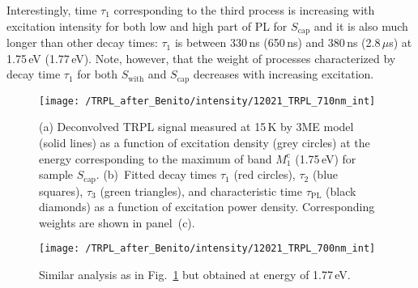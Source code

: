 


Interestingly, time $\tau_1$ corresponding to the third process is increasing with excitation intensity for both low and high part of PL for $S_\mathrm{cap}$ and it is also much longer than other decay times: $\tau_1$ is between 330$\,$ns (650$\,$ns) and 380$\,$ns (2.8$\,$$\mu$s) at 1.75$\,$eV (1.77$\,$eV). Note, however, that the weight of processes characterized by decay time $\tau_1$ for both $S_\mathrm{with}$ and $S_\mathrm{cap}$ decreases with increasing excitation.





\begin{figure}
	\centering
	\texttt{[image: /TRPL\_after\_Benito/intensity/12021\_TRPL\_710nm\_int]}
	\caption{(a) Deconvolved TRPL signal measured at 15$\,$K by 3ME model (solid lines) as a function of excitation density (grey circles) at the energy corresponding to the maximum of band $M_1^\mathrm{c}$ (1.75$\,$eV) for sample $S_\mathrm{cap}$. (b)~Fitted decay times $\tau_1$ (red circles), $\tau_2$ (blue squares), $\tau_3$ (green triangles), and characteristic time $\tau_\mathrm{PL}$ (black diamonds) as a function of excitation power density. Corresponding weights are shown in panel~(c).}
	\label{fig:TRPL_int_c}
\end{figure}

\begin{figure}
	\centering
	\texttt{[image: /TRPL\_after\_Benito/intensity/12021\_TRPL\_700nm\_int]}
	\caption{Similar analysis as in Fig.~\ref{fig:TRPL_int_c} but obtained at energy of 1.77$\,$eV.}
	\label{fig:TRPL_int_c_L}
\end{figure}


